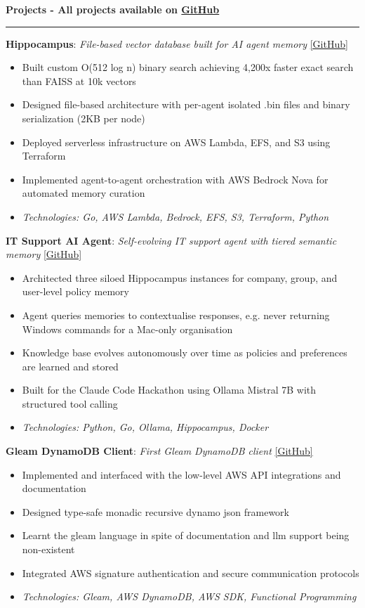 \documentclass[9pt,a4paper]{extarticle}
\renewcommand{\section}[1]{%
	\vspace{2pt}%
	{\large\bfseries #1}\par\nobreak\vspace{-0.7em}%
	\rule{\linewidth}{0.4pt}\par\nobreak%
	\vspace{-2pt}%
}
\newenvironment{tightlist}{%
	\vspace{-3pt}%
	\begin{itemize}%
		\setlength{\leftmargin}{0pt}%
		\setlength{\itemindent}{0pt}%
		\setlength{\itemsep}{-2pt}%
		\setlength{\parsep}{0pt}%
		\setlength{\topsep}{0pt}%
		\setlength{\partopsep}{0pt}%
	}{%
	\end{itemize}%
	\vspace{-6pt}%
}
\begin{document}
	\section{Projects - \textbf{All projects available on} \href{https://github.com/CameronBadman}{GitHub}}
	\textbf{Hippocampus}: \textit{File-based vector database built for AI agent memory} \href{https://github.com/CameronBadman/Hippocampus}{[GitHub]}
	\begin{tightlist}
		\item Built custom O(512 log n) binary search achieving 4,200x faster exact search than FAISS at 10k vectors
		\item Designed file-based architecture with per-agent isolated .bin files and binary serialization (2KB per node)
		\item Deployed serverless infrastructure on AWS Lambda, EFS, and S3 using Terraform
		\item Implemented agent-to-agent orchestration with AWS Bedrock Nova for automated memory curation
		\item \textit{Technologies: Go, AWS Lambda, Bedrock, EFS, S3, Terraform, Python}
	\end{tightlist}
	\textbf{IT Support AI Agent}: \textit{Self-evolving IT support agent with tiered semantic memory} \href{https://github.com/CameronBadman/IT-Agent-Thing}{[GitHub]}
	\begin{tightlist}
		\item Architected three siloed Hippocampus instances for company, group, and user-level policy memory
		\item Agent queries memories to contextualise responses, e.g. never returning Windows commands for a Mac-only organisation
		\item Knowledge base evolves autonomously over time as policies and preferences are learned and stored
		\item Built for the Claude Code Hackathon using Ollama Mistral 7B with structured tool calling
		\item \textit{Technologies: Python, Go, Ollama, Hippocampus, Docker}
	\end{tightlist}
	\textbf{Gleam DynamoDB Client}: \textit{First Gleam DynamoDB client} \href{https://github.com/CameronBadman/DynamoDb-gleam-client}{[GitHub]}
	\begin{tightlist}
		\item Implemented and interfaced with the low-level AWS API integrations and documentation
		\item Designed type-safe monadic recursive dynamo json framework
		\item Learnt the gleam language in spite of documentation and llm support being non-existent
		\item Integrated AWS signature authentication and secure communication protocols
		\item \textit{Technologies: Gleam, AWS DynamoDB, AWS SDK, Functional Programming}
	\end{tightlist}
\end{document}
